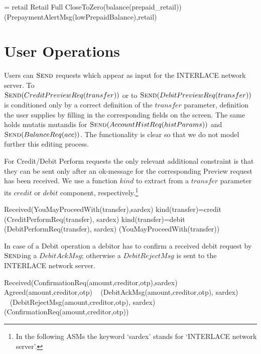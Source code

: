 \begin{asm}
=\+
  \FORALL  retail  \in Retail \cup Full \+
     \IF CloseToZero(balance(prepaid_{retail}))  \THEN \+
        (PrepaymentAlertMsg(lowPrepaidBalance),\TO retail)
\end{asm}
\section{User Operations}
\label{sect:usrops}
Users can $\hbox{\sc Send}$ requests which appear as input for the INTERLACE network server. To\\ $\hbox{\sc Send}(CreditPreviewReq(transfer))$ or to $\hbox{\sc Send}(DebitPreviewReq(transfer))$ is conditioned only by a correct definition of the $transfer$ parameter, definition the user supplies by filling in the corresponding  fields on the screen. The same holds mutatis mutandis for $\hbox{\sc Send}(AccountHistReq(histParams))$ and $\hbox{\sc Send}(BalanceReq(acc))$. The functionality is clear so that we do not model further this editing process.

For Credit/Debit Perform requests the only relevant additional constraint is that they can be sent only after an ok-message for the corresponding Preview request has been received. We use a function $kind$ to extract from a $transfer$ parameter its $credit$ or $debit$ component, respectively.\footnote{In the following ASMs the keyword `sardex' stands for `INTERLACE network server'.}

\begin{asm}
\IF Received(YouMayProceedWith(transfer),\FROM sardex) \THEN \+
\IF kind(transfer)=credit \THEN \+
(CreditPerformReq(transfer), \TO  sardex) \-
\IF kind(transfer)=debit \THEN \+
(DebitPerformReq(transfer), \TO  sardex)  \-
(YouMayProceedWith(transfer))
\end{asm}

In case of a Debit operation a debitor has to confirm a received debit request by $\hbox{\sc Send}$ing a $DebitAckMsg$; otherwise a $DebitRejectMsg$ is sent to the INTERLACE network server.
\begin{asm}
\IF Received(ConfirmationReq(amount,creditor,otp),\FROM sardex) \THEN \+
\IF Agreed(amount,creditor,otp)\+
\THEN ~ (DebitAckMsg(amount,creditor,otp), \TO sardex) \\
\ELSE ~ (DebitRejectMsg(amount,creditor,otp), \TO sardex)\-
(ConfirmationReq(amount,creditor,otp))
\end{asm}


